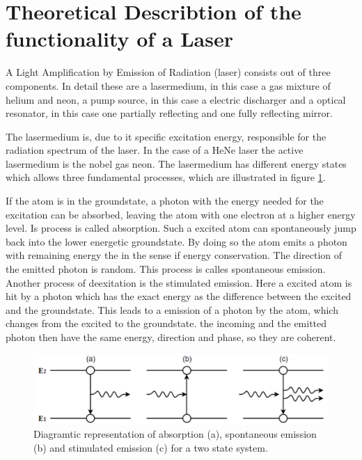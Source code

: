 \section{Theoretical Describtion of the functionality of a Laser}
A Light Amplification by Emission of Radiation (laser) consists out 
of three components. In detail these are a lasermedium, in this case 
a gas mixture of helium and neon, a pump source, in this case a 
electric discharger and a optical resonator, in this case one 
partially reflecting and one fully reflecting mirror. 

The lasermedium is, due to it specific excitation energy, responsible 
for the radiation spectrum of the laser. In the case of a HeNe laser 
the active lasermedium is the nobel gas neon. The lasermedium has 
different energy states which allows three fundamental processes, which 
are illustrated in figure \ref{fig:emission}. 

If the atom is in the groundstate, a photon with the energy needed for the 
excitation can be absorbed, leaving the atom with one electron at a higher 
energy level. Is process is called absorption. Such a excited atom can 
spontaneously jump back into the lower energetic groundstate. By doing so 
the atom emits a photon with remaining energy the  in the sense if energy 
conservation. The direction of the emitted photon is random. This process
is calles spontaneous emission.
Another process of deexitation is the stimulated emission. Here a excited
atom is hit by a photon which has the exact energy as the difference 
between the excited and the groundstate. This leads to a emission of a 
photon by the atom, which changes from the excited to the groundstate.
the incoming and the emitted photon then have the same energy, direction
and phase, so they are coherent.

\begin{figure}
    \centering
    \includegraphics[width=\linewidth]{pictures/emission.png}
    \caption{Diagramtic representation of absorption (a), spontaneous emission (b) and stimulated emission (c) for a two state system.}
    \label{fig:emission}
\end{figure}

